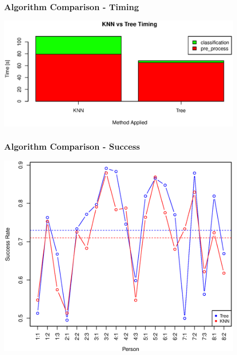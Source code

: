 \documentclass[12pt,a4paper]{beamer}
\begin{document}
\begin{frame}
\frametitle{Algorithm Comparison - Timing}
\includegraphics[width=0.9\textwidth]{../report/graphics/algo_compare_timing}
\end{frame}

\begin{frame}
\frametitle{Algorithm Comparison - Success}
\includegraphics[width=0.9\textwidth]{../report/graphics/success_comp_hard}
\end{frame}
\end{document}
